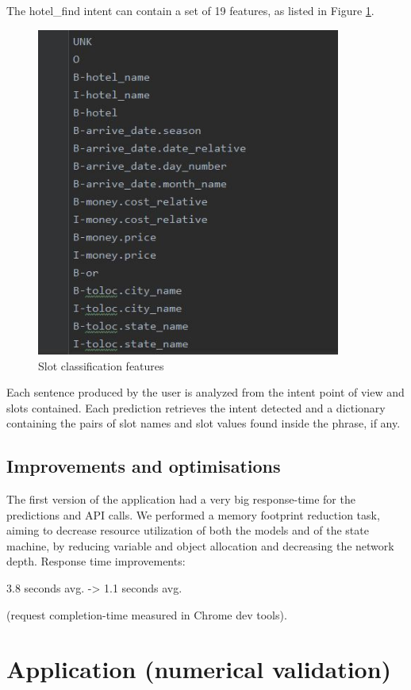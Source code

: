\documentclass[runningheads,a4paper,11pt]{report}
\begin{document}
The hotel\_find intent can contain a set of 19 features, as listed in Figure \ref{slots}.

\begin{figure}
\centerline{\includegraphics[width=10cm]{slots}}  
	\caption{Slot classification features}
	\label{slots}
\end{figure}

Each sentence produced by the user is analyzed from the intent point of view and slots contained. Each prediction retrieves the intent detected and a dictionary containing the pairs of slot names and slot values found inside the phrase, if any.

\section{Improvements and optimisations}
\label{section:optim}

The first version of the application had a very big response-time for the predictions and API calls. We performed a memory footprint reduction task, aiming to decrease resource utilization of both the models and of the state machine, by reducing variable and object allocation and decreasing the network depth. Response time improvements: 

        3.8 seconds avg. -> 1.1 seconds avg. 
        
        (request completion-time measured in Chrome dev tools).



\chapter{Application (numerical validation)}
\label{chapter:applicaion}
\end{document}
